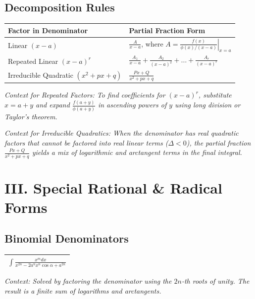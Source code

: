 \documentclass[11pt, a4paper]{article}
\begin{document}
\subsection*{\color{secondary} Decomposition Rules}
\begin{center}
\begin{tabular}{@{}p{} p{}@{}}
\toprule
\textbf{Factor in Denominator} & \textbf{Partial Fraction Form} \\
\midrule
Linear $(x-a)$ & $\frac{A}{x-a}$, where $A = \left. \frac{f(x)}{\phi(x)/(x-a)} \right|_{x=a}$ \\
Repeated Linear $(x-a)^r$ & $\frac{A_1}{x-a} + \frac{A_2}{(x-a)^2} + \dots + \frac{A_r}{(x-a)^r}$ \\
Irreducible Quadratic $(x^2+px+q)$ & $\frac{Px+Q}{x^2+px+q}$ \\
\bottomrule
\end{tabular}
\end{center}

\vspace{0.2cm}

\textit{\small Context for Repeated Factors: To find coefficients for $(x-a)^r$, substitute $x = a+y$ and expand $\frac{f(a+y)}{\phi(a+y)}$ in ascending powers of $y$ using long division or Taylor's theorem.}

\vspace{0.2cm}

\textit{\small Context for Irreducible Quadratics: When the denominator has real quadratic factors that cannot be factored into real linear terms ($\Delta < 0$), the partial fraction $\frac{Px+Q}{x^2+px+q}$ yields a mix of logarithmic and arctangent terms in the final integral.}

\section*{\color{primary} III. Special Rational \& Radical Forms}

\subsection*{\color{secondary} Binomial Denominators}
\begin{center}
\begin{tabular}{@{}p{}@{}}
\toprule
$\int \frac{x^{m} dx}{x^{2n} - 2a^n x^n \cos \alpha + a^{2n}}$ \\
\bottomrule
\end{tabular}
\end{center}
\vspace{0.15cm}
\textit{\small Context: Solved by factoring the denominator using the $2n$-th roots of unity. The result is a finite sum of logarithms and arctangents.}
\end{document}
